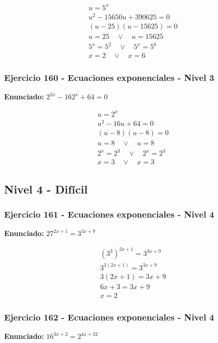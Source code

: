 \documentclass[12pt,a4paper]{article}
\begin{document}
\[
\begin{aligned}
u=5^x\\
u^2-15650u+390625=0\\
(u-25)(u-15625)=0\\
u=25\quad \vee\quad u=15625\\
5^x=5^{2}\quad \vee\quad 5^x=5^{6}\\
\boxed{x=2\quad \vee\quad x=6}
\end{aligned}
\]


\subsubsection*{Ejercicio 160 - Ecuaciones exponenciales - Nivel 3}
\textbf{Enunciado:} \(2^{2x}-162^x+64=0\)

\[
\begin{aligned}
u=2^x\\
u^2-16u+64=0\\
(u-8)(u-8)=0\\
u=8\quad \vee\quad u=8\\
2^x=2^{3}\quad \vee\quad 2^x=2^{3}\\
\boxed{x=3\quad \vee\quad x=3}
\end{aligned}
\]


\newpage

\subsection*{Nivel 4 - Difícil}

\subsubsection*{Ejercicio 161 - Ecuaciones exponenciales - Nivel 4}
\textbf{Enunciado:} \(27^{2x+1}=3^{3x+9}\)

\[
\begin{aligned}
(3^{3})^{2x+1}=3^{3x+9}\\
3^{3(2x+1)}=3^{3x+9}\\
3(2x+1)=3x+9\\
6x+3=3x+9\\
\boxed{x=2}
\end{aligned}
\]


\subsubsection*{Ejercicio 162 - Ecuaciones exponenciales - Nivel 4}
\textbf{Enunciado:} \(16^{3x+2}=2^{4x+32}\)
\end{document}
